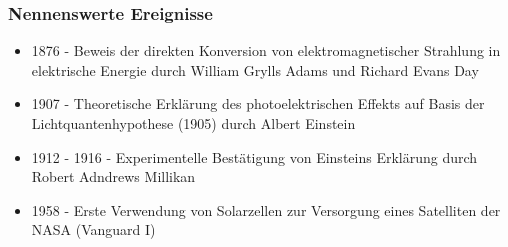     \subsubsection{Nennenswerte Ereignisse}
        \begin{itemize}
            \item 1876 - Beweis der direkten Konversion von elektromagnetischer
                Strahlung in elektrische Energie durch William Grylls Adams und
                Richard Evans Day
            \item 1907 - Theoretische Erklärung des photoelektrischen Effekts auf
                Basis der Lichtquantenhypothese (1905) durch Albert Einstein
            \item 1912 - 1916 - Experimentelle Bestätigung von Einsteins Erklärung
                durch Robert Adndrews Millikan
            \item 1958 - Erste Verwendung von Solarzellen zur Versorgung eines
                Satelliten der NASA (Vanguard I) \cite{Wiki_Vanguard}
        \end{itemize}